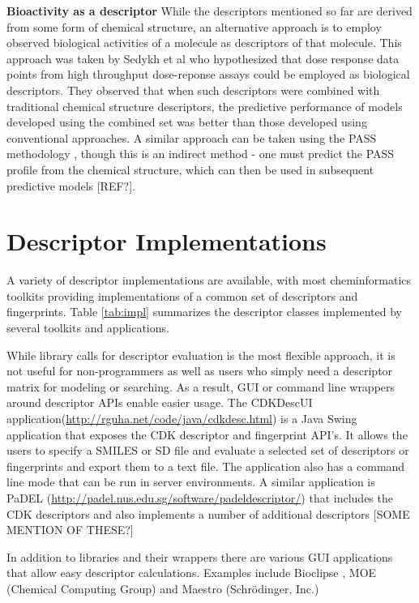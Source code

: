 \documentclass[letterpaper, 12pt]{article}
\begin{document}
\textbf{Bioactivity as a descriptor} While the descriptors mentioned
so far are derived from some form of chemical structure, an
alternative approach is to employ observed biological activities of a
molecule as descriptors of that molecule.  This approach was taken by
Sedykh et al \cite{Sedykh:2011fk} who hypothesized that dose response
data points from high throughput dose-reponse assays could be employed
as biological descriptors. They observed that when such descriptors
were combined with traditional chemical structure descriptors, the
predictive performance of models developed using the combined set was
better than those developed using conventional approaches. A similar
approach can be taken using the PASS methodology
\cite{Poroikov:2007aa}, though this is an indirect method - one must
predict the PASS profile from the chemical structure, which can then
be used in subsequent predictive models [REF?].

\section{Descriptor Implementations}
\label{sec:descr-impl}

A variety of descriptor implementations are available, with most
cheminformatics toolkits providing implementations of a common set of
descriptors and fingerprints. Table \ref{tab:impl} summarizes the
descriptor classes implemented by several toolkits and applications. 

While library calls for descriptor evaluation is the most flexible
approach, it is not useful for non-programmers as well as users who
simply need a descriptor matrix for modeling or searching. As a
result, GUI or command line wrappers around descriptor APIs enable
easier usage. The CDKDescUI
application(\url{http://rguha.net/code/java/cdkdesc.html}) is a Java
Swing application that exposes the CDK descriptor and fingerprint
API's. It allows the users to specify a SMILES or SD file and evaluate
a selected set of descriptors or fingerprints and export them to a
text file. The application also has a command line mode that can be
run in server environments. A similar application is PaDEL
(\url{http://padel.nus.edu.sg/software/padeldescriptor/}) that
includes the CDK descriptors and also implements a number of
additional descriptors [SOME MENTION OF THESE?]

In addition to libraries and their wrappers there are various GUI
applications that allow easy descriptor calculations. Examples include
Bioclipse \cite{Spjuth:2007aa}, MOE (Chemical Computing Group) and
Maestro (Schr\"{o}dinger, Inc.)
\end{document}
